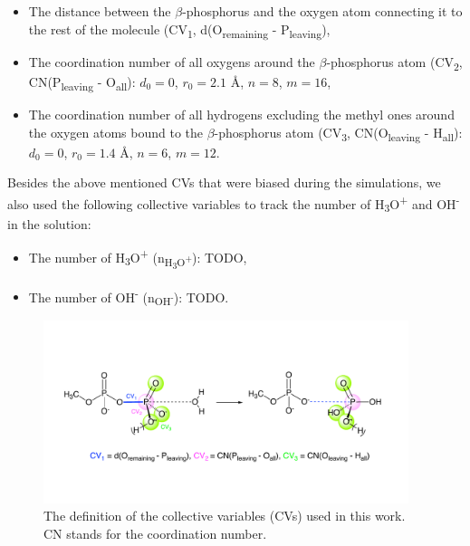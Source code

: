 \begin{itemize}
    \item The distance between the $\beta$-phosphorus and the oxygen atom connecting it to the rest of the molecule (CV\textsubscript{1}, d(O\textsubscript{remaining} - P\textsubscript{leaving}),
    \item The coordination number of all oxygens around the $\beta$-phosphorus atom (CV\textsubscript{2}, CN(P\textsubscript{leaving} - O\textsubscript{all}): $d_0 = 0$, $r_0 = 2.1$ \AA, $n = 8$, $m = 16$,
    \item The coordination number of all hydrogens excluding the methyl ones around the oxygen atoms bound to the $\beta$-phosphorus atom (CV\textsubscript{3}, CN(O\textsubscript{leaving} - H\textsubscript{all}): $d_0 = 0$, $r_0 = 1.4$ \AA, $n = 6$, $m = 12$.
\end{itemize}

Besides the above mentioned CVs that were biased during the simulations, we also used the following collective variables to track the number of H\textsubscript{3}O\textsuperscript{+} and OH\textsuperscript{-} in the solution:
\begin{itemize}
    \item The number of H\textsubscript{3}O\textsuperscript{+} (n\textsubscript{H\textsubscript{3}O\textsuperscript{+}}): TODO,
    \item The number of OH\textsuperscript{-} (n\textsubscript{OH\textsuperscript{-}}): TODO.
\end{itemize}

\begin{figure}[t!]
    \centering
    \includegraphics[width=0.95\textwidth]{Figures/3_Computational_details/collective_variables.pdf}
    \caption{The definition of the collective variables (CVs) used in this work. CN stands for the coordination number.}
    \label{fig:collective_variables}
\end{figure}

